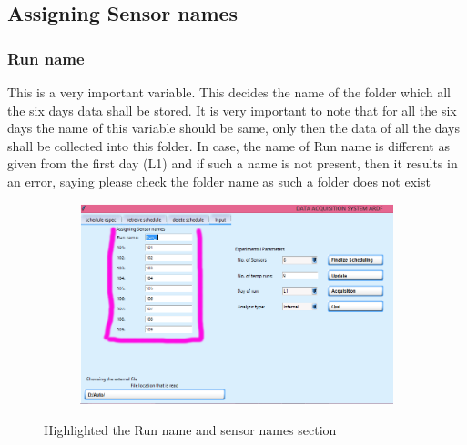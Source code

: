 \documentclass[12pt]{article}
\begin{document}
 \subsection{Assigning Sensor names}
  
    \subsubsection{Run name}
     This is a very important variable. This decides the name of the folder which all the six days data shall be stored. It is very important to note that for all the six days the name of  this variable should be same, only then the data of all the days shall be collected into this folder. In case, the name of Run name is different as given from  the first day (L1) and if such a name is not present, then it results in an error, saying please check the folder name as such a folder does not exist
   
   
   \begin{figure}[H]
 
    \begin{subfigure}{1.0\textwidth}
    \includegraphics[scale=0.5]{images/assigning_sensor_names.png} 
    \label{fig:DJp1}
    \end{subfigure}
 
 \caption{Highlighted the Run name and sensor names section}
\label{fig6}
\end{figure}
   
   
   
    
    
\end{document}
